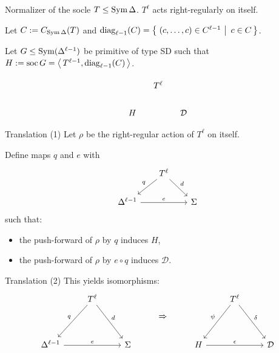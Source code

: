 \documentclass{beamer}
\theoremstyle{plain}
\theoremstyle{definition}
\begin{document}

\begin{frame}{Normalizer of the socle}
$T \leq \operatorname{Sym} \Delta$.
$T ^ \ell$ acts right-regularly on itself.

Let $C := C_{\operatorname{Sym} \Delta}(T)$
and
$\operatorname{diag}_{\ell - 1}(C) =  \left\{ \left.\, (c, \ldots, c) \in C ^ {\ell - 1} ~\right|~  c \in C  \,\right\} $.

Let $G \leq \operatorname{Sym}(\Delta ^ {\ell - 1})$ be primitive of type SD such that
$H := \operatorname{soc} G =  \left\langle \,  T ^ {\ell - 1}, \operatorname{diag}_{\ell - 1}(C)  \, \right\rangle $.

\pause
\[
\begin{tikzcd}[column sep=small, ampersand replacement=\&]
    \&
    T ^ \ell
    \&
    \\
    H
    \&
    \&
    \mathcal D
\end{tikzcd}
\]
\end{frame}

\begin{frame}{Translation (1)}
Let $\rho$ be the right-regular action of $T ^ \ell$ on itself.

Define maps $q$ and $e$ with
\[
\begin{tikzcd}[column sep=scriptsize, ampersand replacement=\&]
    \&
    T ^ \ell
        \ar[ld, "q"']
        \ar[rd, "d"]
    \&
    \\
    \Delta ^ {\ell - 1}
        \ar[rr, "e"]
    \&
    \&
    \Sigma
\end{tikzcd}
\]
such that:
\begin{itemize}
\item the push-forward of $\rho$ by $q$ induces $H$,
\item the push-forward of $\rho$ by $e \circ q$ induces $\mathcal D$.
\end{itemize}
\end{frame}

\begin{frame}{Translation (2)}
This yields isomorphisms:
\[
\begin{tikzcd}[ampersand replacement=\&]
    \&
    T ^ \ell
        \ar[ld, "q"']
        \ar[rd, "d"]
    \&
    \&
    \raisebox{-2em}{$\Rightarrow$}
    \&
    \&
    T ^ \ell
        \ar[ld, "\psi"']
        \ar[rd, "\delta"]
    \&
    \\
    \Delta ^ {\ell - 1}
        \ar[rr, "e"]
    \&
    \&
    \Sigma
    \&
    \&
    H
        \ar[rr, "\epsilon"]
    \&
    \&
    \mathcal D
\end{tikzcd}
\]
\end{frame}
\end{document}
